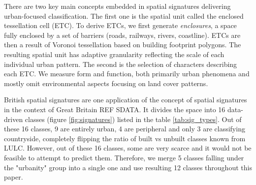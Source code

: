 There are two key main concepts embedded in spatial signatures delivering urban-focused
classification. The first one is the spatial unit called the enclosed tessellation cell
(ETC). To derive ETCs, we first generate \textit{enclosures}, a space fully enclosed by
a set of barriers (roads, railways, rivers, coastline). ETCs are then a result of
Voronoi tessellation based on building footprint polygons. The resulting spatial unit
has adaptive granularity reflecting the scale of each individual urban pattern. The
second is the selection of characters describing each ETC. We measure form and function,
both primarily urban phenomena and mostly omit environmental aspects focusing on land
cover patterns.


British spatial signatures are one application of the concept of spatial signatures in
the context of Great Britain REF SDATA. It divides the space into 16 data-driven classes
(figure \ref{fig:signatures}) listed in the table \ref{tab:sig_types}. Out of these 16
classes, 9 are entirely urban, 4 are peripheral and only 3 are classifying countryside,
completely flipping the ratio of built vs unbuilt classes known from LULC. However, out
of these 16 classes, some are very scarce and it would not be feasible to attempt to
predict them. Therefore, we merge 5 classes falling under the "urbanity" group into a
single one and use resulting 12 classes throughout this paper.


